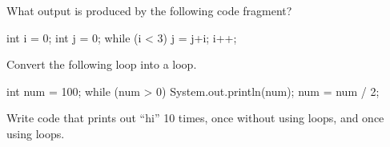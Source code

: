 \begin{exercise}
What output is produced by the following code fragment?

\begin{code}
int i = 0;
int j = 0;
while (i < 3)
{
  j = j+i;
  i++;
}
\end{code}
\end{exercise}

\begin{exercise}
Convert the following loop into a  loop.

\begin{code}
int num = 100;
while (num > 0)
{
    System.out.println(num);
    num = num / 2;
}
\end{code}
\end{exercise}

\begin{exercise}
  Write code that prints out ``hi'' 10 times, once without using loops, and once
  using loops.
\end{exercise}

